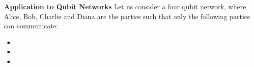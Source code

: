 \documentclass[usenames,dvipsnames]{beamer}
\begin{document}
	\begin{frame}{\textbf{Application to Qubit Networks}}
		Let us consider a four qubit
		network, where Alice, Bob, Charlie and Diana are the parties such that only the following
		parties can communicate:
		\begin{itemize}
			\item {}
			\item {}
			\item {}
		\end{itemize}
		\begin{figure}
			\centering
\end{figure}
\end{frame}
\end{document}
